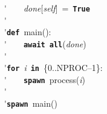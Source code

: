 \'\>~~~~\textit{done}[\textit{self}]~=~\texttt{\textbf{True}}\\

\'\>\\

\'\>\texttt{\textbf{def}}~main():\\

\'\>~~~~\texttt{\textbf{await}}~\texttt{\textbf{all}}(\textit{done})\\

\'\>\\

\'\>\texttt{\textbf{for}}~\textit{i}~\texttt{\textbf{in}}~\{0..NPROC--1\}:\\

\'\>~~~~\texttt{\textbf{spawn}}~process(\textit{i})\\

\'\>\\

\'\>\texttt{\textbf{spawn}}~main()